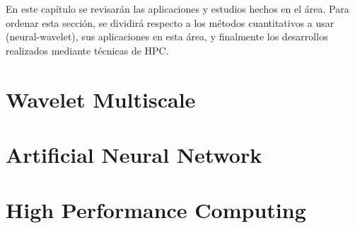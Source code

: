 En este capítulo se revisarán las aplicaciones y estudios hechos en el área. Para ordenar esta sección, se
dividirá respecto a los métodos cuantitativos a usar (neural-wavelet), sus aplicaciones en esta área, y finalmente
los desarrollos realizados mediante técnicas de HPC.

\section{Wavelet Multiscale}

\section{Artificial Neural Network}

\section{High Performance Computing}
